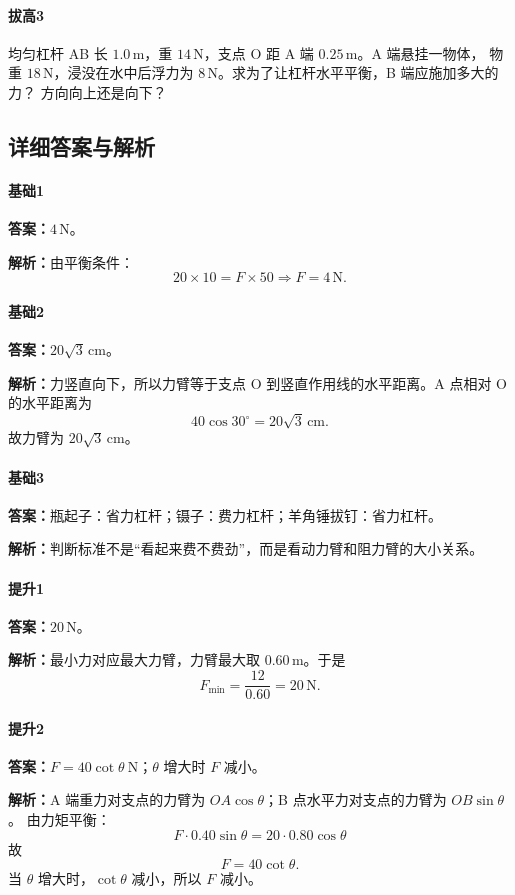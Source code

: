 \documentclass[12pt,a4paper]{ctexart}
\newcommand{\Ans}[1]{\par\noindent\textbf{答案：}#1\par}
\newcommand{\Sol}[1]{\par\noindent\textbf{解析：}#1\par}
\begin{document}
\paragraph{拔高3}
均匀杠杆 AB 长 $1.0\,\mathrm{m}$，重 $14\,\mathrm{N}$，支点 O 距 A 端 $0.25\,\mathrm{m}$。A 端悬挂一物体，
物重 $18\,\mathrm{N}$，浸没在水中后浮力为 $8\,\mathrm{N}$。求为了让杠杆水平平衡，B 端应施加多大的力？
方向向上还是向下？

\subsection{详细答案与解析}

\paragraph{基础1}
\Ans{$4\,\mathrm{N}$。}
\Sol{由平衡条件：
\[
20\times 10 = F\times 50
\Rightarrow F=4\,\mathrm{N}.
\]}

\paragraph{基础2}
\Ans{$20\sqrt{3}\,\mathrm{cm}$。}
\Sol{力竖直向下，所以力臂等于支点 O 到竖直作用线的水平距离。A 点相对 O 的水平距离为
\[
40\cos 30^\circ = 20\sqrt{3}\,\mathrm{cm}.
\]
故力臂为 $20\sqrt{3}\,\mathrm{cm}$。}

\paragraph{基础3}
\Ans{瓶起子：省力杠杆；镊子：费力杠杆；羊角锤拔钉：省力杠杆。}
\Sol{判断标准不是“看起来费不费劲”，而是看动力臂和阻力臂的大小关系。}

\paragraph{提升1}
\Ans{$20\,\mathrm{N}$。}
\Sol{最小力对应最大力臂，力臂最大取 $0.60\,\mathrm{m}$。于是
\[
F_{\min}=\frac{12}{0.60}=20\,\mathrm{N}.
\]}

\paragraph{提升2}
\Ans{$F=40\cot\theta\ \mathrm{N}$；$\theta$ 增大时 $F$ 减小。}
\Sol{A 端重力对支点的力臂为 $OA\cos\theta$；B 点水平力对支点的力臂为 $OB\sin\theta$。
由力矩平衡：
\[
F\cdot 0.40\sin\theta = 20\cdot 0.80\cos\theta
\]
故
\[
F=40\cot\theta.
\]
当 $\theta$ 增大时，$\cot\theta$ 减小，所以 $F$ 减小。}
\end{document}
